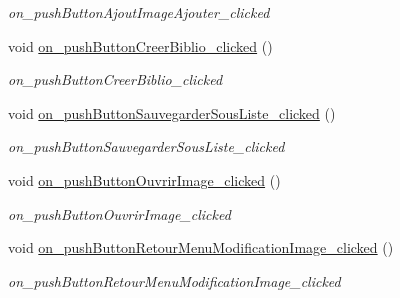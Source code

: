 \begin{DoxyCompactItemize}
\begin{DoxyCompactList}\small\item\em on\+\_\+push\+Button\+Ajout\+Image\+Ajouter\+\_\+clicked \end{DoxyCompactList}\item 
\mbox{\label{classAppMainWindow_a9a3339b93e5dc22b925092f771c3079b}} 
void \hyperlink{classAppMainWindow_a9a3339b93e5dc22b925092f771c3079b}{on\+\_\+push\+Button\+Creer\+Biblio\+\_\+clicked} ()
\begin{DoxyCompactList}\small\item\em on\+\_\+push\+Button\+Creer\+Biblio\+\_\+clicked \end{DoxyCompactList}\item 
\mbox{\label{classAppMainWindow_a15481935096c0f5b09cdb611fc9cde2a}} 
void \hyperlink{classAppMainWindow_a15481935096c0f5b09cdb611fc9cde2a}{on\+\_\+push\+Button\+Sauvegarder\+Sous\+Liste\+\_\+clicked} ()
\begin{DoxyCompactList}\small\item\em on\+\_\+push\+Button\+Sauvegarder\+Sous\+Liste\+\_\+clicked \end{DoxyCompactList}\item 
\mbox{\label{classAppMainWindow_aab451b9f2216824cb996f5b0df9a57ac}} 
void \hyperlink{classAppMainWindow_aab451b9f2216824cb996f5b0df9a57ac}{on\+\_\+push\+Button\+Ouvrir\+Image\+\_\+clicked} ()
\begin{DoxyCompactList}\small\item\em on\+\_\+push\+Button\+Ouvrir\+Image\+\_\+clicked \end{DoxyCompactList}\item 
\mbox{\label{classAppMainWindow_af31732baab71f621b62bf06df6a7e8bf}} 
void \hyperlink{classAppMainWindow_af31732baab71f621b62bf06df6a7e8bf}{on\+\_\+push\+Button\+Retour\+Menu\+Modification\+Image\+\_\+clicked} ()
\begin{DoxyCompactList}\small\item\em on\+\_\+push\+Button\+Retour\+Menu\+Modification\+Image\+\_\+clicked \end{DoxyCompactList}\item 
\mbox{\label{classAppMainWindow_a788925d89b1ddd65bd925bbe5edd228d}} 

\end{DoxyCompactItemize}
